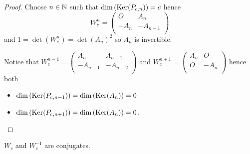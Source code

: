 \begin{proof}
  Choose $n\in\mathbb{N}$ such that $\dim\left(\operatorname{Ker}(P_{c,n})\right) = c$ hence
  \[
  W_{c}^{n}
  =
  \left(
  \begin{array}{cc}
     O    &  A_{n}  \\
    -A_{n} & -A_{n-1} \\
  \end{array}
  \right)
  \]
  and $1 = \det(W_{c}^{n}) = \det(A_{n})^{2}$ so $A_{n}$ is
  invertible.

  Notice that 
  $W_{c}^{n-1} = \left(\begin{smallmatrix} A_{n} & A_{n-1} \\-A_{n-1} & -A_{n-2} \\\end{smallmatrix}\right)$
  and
  $W_{c}^{n+1} = \left(\begin{smallmatrix} A_{n} & O \\ O & -A_{n} \\\end{smallmatrix}\right)$
  hence both
  \begin{itemize}
    \item $\dim\left(\operatorname{Ker}(P_{c,n-1})\right) = \dim\left(\operatorname{Ker}(A_{n})\right) = 0$
    \item $\dim\left(\operatorname{Ker}(P_{c,n+1})\right) = \dim\left(\operatorname{Ker}(A_{n})\right) = 0$.
  \end{itemize}
\end{proof}

\begin{lemma}
  $W_{c}$ and $W_{c}^{-1}$ are conjugates.
\end{lemma}

